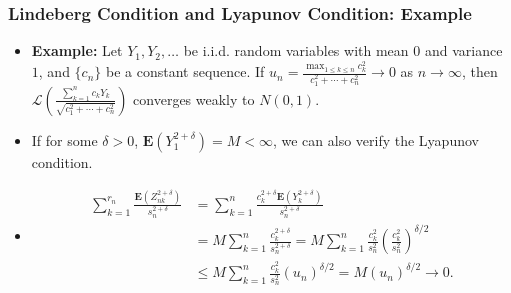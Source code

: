 \documentclass[handout]{beamer}
\newcommand{\BE}{\mathbf{E}}
\begin{document}
     \frame
{
  \frametitle{Lindeberg Condition and Lyapunov Condition: Example}
   \begin{itemize}


\item<1->\textbf{Example:} Let $Y_1, Y_2,\ldots$ be i.i.d. random variables with mean $0$ and variance $1$, and $\{c_n\}$ be a constant sequence. If $u_n=\frac{\max_{1\leq k\leq n} c_k^2}{c_1^2+\cdots+c_n^2}\rightarrow 0$ as $n \rightarrow \infty$, then $\mathcal{L}(\frac{\sum_{k=1}^n c_kY_k}{\sqrt{c_1^2+\cdots+c_n^2}})$ converges weakly to $N(0,1)$. 


\item<2-> If for some $\delta>0$, $\BE(Y_1^{2+\delta})=M<\infty$, we can also verify the Lyapunov condition.

\item<3->[] \begin{align*}
\sum_{k=1}^{r_n} \frac{ \BE(Z_{nk}^{2+\delta})}{s_n^{2+\delta}}& =\sum_{k=1}^{n} \frac{c_k^{2+\delta} \BE(Y_{k}^{2+\delta})}{s_n^{2+\delta}}\\
&=M\sum_{k=1}^{n} \frac{c_k^{2+\delta}}{s_n^{2+\delta}}=M\sum_{k=1}^{n} \frac{c_k^{2}}{s_n^2} (\frac{c_k^2}{s_n^2})^{\delta/2} \\
&\leq M\sum_{k=1}^{n} \frac{c_k^{2}}{s_n^2} (u_n)^{\delta/2}=M (u_n)^{\delta/2}  \rightarrow 0.
\end{align*}

\end{itemize}
}
 
 
\end{document}
